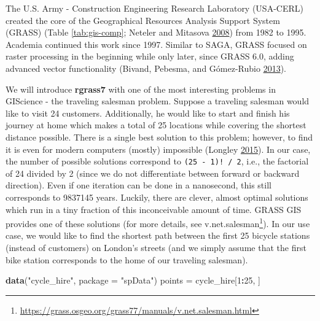 \documentclass[]{krantz}
\newenvironment{Shaded}{\begin{snugshade}}{\end{snugshade}}
\newcommand{\DataTypeTok}[1]{\textcolor[rgb]{0.27,0.27,0.27}{#1}}
\newcommand{\DecValTok}[1]{\textcolor[rgb]{0.06,0.06,0.06}{#1}}
\newcommand{\KeywordTok}[1]{\textcolor[rgb]{0.27,0.27,0.27}{\textbf{#1}}}
\newcommand{\NormalTok}[1]{#1}
\newcommand{\OperatorTok}[1]{\textcolor[rgb]{0.43,0.43,0.43}{\textbf{#1}}}
\newcommand{\StringTok}[1]{\textcolor[rgb]{0.5,0.5,0.5}{#1}}
\let\rmarkdownfootnote\footnote%
\def\footnote{\protect\rmarkdownfootnote}
\renewcommand{\href}[2]{#2\footnote{\url{#1}}}
\begin{document}
The U.S. Army - Construction Engineering Research Laboratory (USA-CERL) created the core of the Geographical Resources Analysis Support System (GRASS) (Table \ref{tab:gis-comp}; Neteler and Mitasova \protect\hyperlink{ref-neteler_open_2008}{2008}) from 1982 to 1995.
Academia continued this work since 1997.
Similar to SAGA, GRASS focused on raster processing in the beginning while only later, since GRASS 6.0, adding advanced vector functionality (Bivand, Pebesma, and Gómez-Rubio \protect\hyperlink{ref-bivand_applied_2013}{2013}).

We will introduce \textbf{rgrass7} with one of the most interesting problems in GIScience - the traveling salesman problem.
Suppose a traveling salesman would like to visit 24 customers.
Additionally, he would like to start and finish his journey at home which makes a total of 25 locations while covering the shortest distance possible.
There is a single best solution to this problem; however, to find it is even for modern computers (mostly) impossible (Longley \protect\hyperlink{ref-longley_geographic_2015}{2015}).
In our case, the number of possible solutions correspond to \texttt{(25\ -\ 1)!\ /\ 2}, i.e., the factorial of 24 divided by 2 (since we do not differentiate between forward or backward direction).
Even if one iteration can be done in a nanosecond, this still corresponds to 9837145 years.
Luckily, there are clever, almost optimal solutions which run in a tiny fraction of this inconceivable amount of time.
GRASS GIS provides one of these solutions (for more details, see \href{https://grass.osgeo.org/grass77/manuals/v.net.salesman.html}{v.net.salesman}).
In our use case, we would like to find the shortest path between the first 25 bicycle stations (instead of customers) on London's streets (and we simply assume that the first bike station corresponds to the home of our traveling salesman).

\begin{Shaded}
\begin{Highlighting}[]
\KeywordTok{data}\NormalTok{(}\StringTok{"cycle_hire"}\NormalTok{, }\DataTypeTok{package =} \StringTok{"spData"}\NormalTok{)}
\NormalTok{points =}\StringTok{ }\NormalTok{cycle_hire[}\DecValTok{1}\OperatorTok{:}\DecValTok{25}\NormalTok{, ]}
\end{Highlighting}
\end{Shaded}
\end{document}
